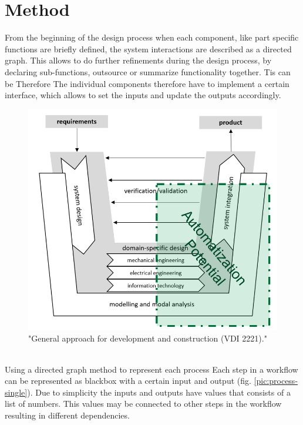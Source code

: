 \section{Method}
From the beginning of the design process when each component, 
like part specific functions are briefly defined, the system interactions 
are described as a directed graph.
This allows to do further refinements during the design process, 
by declaring sub-functions, outsource or summarize functionality together.
Tis can be 
Therefore
The individual components therefore have to implement a certain interface, 
which allows to set the inputs and update the outputs accordingly.
\begin{figure}[h]
    \centering
    \includegraphics[scale=0.5]{pics/VDI_2206.PNG}
    \caption{\label{pic:VDI2206} "General approach for development and construction (VDI 2221)." \cite{Jansch2006THEDO}}
\end{figure}\\
Using a directed graph method to represent each process Each step in a workflow can be represented as blackbox with a certain input and output (fig. \ref{pic:process-single}).
Due to simplicity the inputs and outputs have values that consists of a list of numbers. 
This values may be connected to other steps in the workflow resulting in different dependencies.

